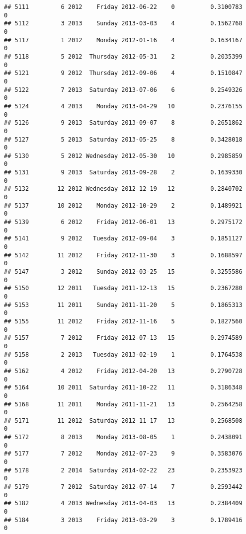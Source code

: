 \documentclass[
]{article}
\begin{document}
\begin{verbatim}
## 5111         6 2012    Friday 2012-06-22    0          0.3100783             0
## 5112         3 2013    Sunday 2013-03-03    4          0.1562768             0
## 5117         1 2012    Monday 2012-01-16    4          0.1634167             0
## 5118         5 2012  Thursday 2012-05-31    2          0.2035399             0
## 5121         9 2012  Thursday 2012-09-06    4          0.1510847             0
## 5122         7 2013  Saturday 2013-07-06    6          0.2549326             0
## 5124         4 2013    Monday 2013-04-29   10          0.2376155             0
## 5126         9 2013  Saturday 2013-09-07    8          0.2651862             0
## 5127         5 2013  Saturday 2013-05-25    8          0.3428018             0
## 5130         5 2012 Wednesday 2012-05-30   10          0.2985859             0
## 5131         9 2013  Saturday 2013-09-28    2          0.1639330             0
## 5132        12 2012 Wednesday 2012-12-19   12          0.2840702             0
## 5137        10 2012    Monday 2012-10-29    2          0.1489921             0
## 5139         6 2012    Friday 2012-06-01   13          0.2975172             0
## 5141         9 2012   Tuesday 2012-09-04    3          0.1851127             0
## 5142        11 2012    Friday 2012-11-30    3          0.1688597             0
## 5147         3 2012    Sunday 2012-03-25   15          0.3255586             0
## 5150        12 2011   Tuesday 2011-12-13   15          0.2367280             0
## 5153        11 2011    Sunday 2011-11-20    5          0.1865313             0
## 5155        11 2012    Friday 2012-11-16    5          0.1827560             0
## 5157         7 2012    Friday 2012-07-13   15          0.2974589             0
## 5158         2 2013   Tuesday 2013-02-19    1          0.1764538             0
## 5162         4 2012    Friday 2012-04-20   13          0.2790728             0
## 5164        10 2011  Saturday 2011-10-22   11          0.3186348             0
## 5168        11 2011    Monday 2011-11-21   13          0.2564258             0
## 5171        11 2012  Saturday 2012-11-17   13          0.2568508             0
## 5172         8 2013    Monday 2013-08-05    1          0.2438091             0
## 5177         7 2012    Monday 2012-07-23    9          0.3583076             0
## 5178         2 2014  Saturday 2014-02-22   23          0.2353923             0
## 5179         7 2012  Saturday 2012-07-14    7          0.2593442             0
## 5182         4 2013 Wednesday 2013-04-03   13          0.2384409             0
## 5184         3 2013    Friday 2013-03-29    3          0.1789416             0

\end{verbatim}
\end{document}
